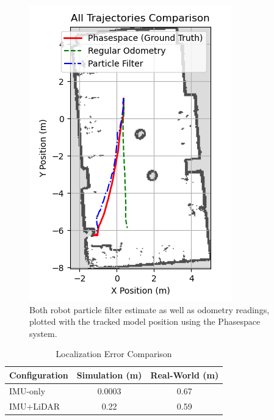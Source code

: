 \documentclass[10.5pt]{article}
\begin{document}
\begin{figure}[H]
    \centering
    \includegraphics[width=1\linewidth]{combined_trajectories_robot.png}
    \caption{Both robot particle filter estimate as well as odometry readings, plotted with the tracked model position using the Phasespace system.}
    \label{fig:real_traj}
\end{figure}
\begin{table}
\centering
\caption{Localization Error Comparison}
\label{tab:errors}
\begin{tabular}{lcc}
\toprule
\textbf{Configuration} & \textbf{Simulation (m)} & \textbf{Real-World (m)} \\
\midrule
IMU-only & 0.0003 & 0.67 \\
IMU+LiDAR & 0.22 & 0.59 \\
\bottomrule
\end{tabular}
\end{table}
\end{document}
